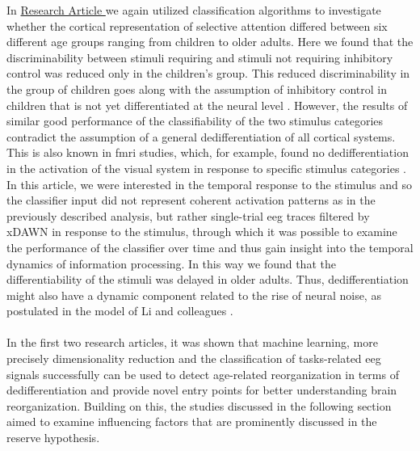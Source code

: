 In \hyperref[results:paperII]{Research Article } we again utilized classification algorithms to investigate whether the cortical representation of selective attention differed between six different age groups ranging from children to older adults. Here we found that the discriminability between stimuli requiring and stimuli not requiring inhibitory control was reduced only in the children's group. This reduced discriminability in the group of children goes along with the assumption of inhibitory control in children that is not yet differentiated at the neural level \cite{Waszak2010,Reuter2019}. However, the results of similar good performance of the classifiability of the two stimulus categories contradict the assumption of a general dedifferentiation of all cortical systems. This is also known in \gls{fmri} studies, which, for example, found no dedifferentiation in the activation of the visual system in response to specific stimulus categories \cite{Voss2008}. In this article, we were interested in the temporal response to the stimulus and so the classifier input did not represent coherent activation patterns as in the previously described analysis, but rather single-trial eeg traces filtered by xDAWN in response to the stimulus, through which it was possible to examine the performance of the classifier over time and thus gain insight into the temporal dynamics of information processing. In this way we found that the differentiability of the stimuli was delayed in older adults. Thus, dedifferentiation might also have a dynamic component related to the rise of neural noise, as postulated in the model of Li and colleagues \cite{Li2001,Li2000}.\\
\\
In the first two research articles, it was shown that machine learning, more precisely dimensionality reduction and the classification of tasks-related \gls{eeg} signals successfully can be used to detect age-related reorganization in terms of dedifferentiation and provide novel entry points for better understanding brain reorganization. Building on this, the studies discussed in the following section aimed to examine influencing factors that are prominently discussed in the reserve hypothesis. 


